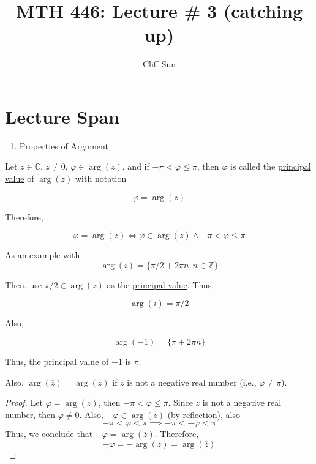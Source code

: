 \documentclass{article}
\title{MTH 446: Lecture \# 3 (catching up)}
\author{Cliff Sun}
\newtheorem{one minute paper}[theorem]{One Minute Paper}
\begin{document}
\maketitle

\section*{Lecture Span}
\begin{enumerate}
    \item Properties of Argument
\end{enumerate}

Let $z \in \mathbb{C}$, $z \neq 0$, $\varphi \in \arg(z)$, and if $-\pi < \varphi \leq \pi$, then 
$\varphi$ is called the \underline{principal value} of $\arg(z)$ with notation 

\begin{equation}
    \varphi = \arg(z)
\end{equation}

Therefore, 

\begin{equation}
    \varphi = \arg(z) \iff \varphi \in \arg(z) \land -\pi  < \varphi \leq \pi
\end{equation}

As an example with
\begin{equation}
    \arg(i) = \{\pi/2 + 2\pi n, n \in \mathbb{Z}\}
\end{equation}

Then, use $\pi/2 \in \arg(z)$ as the \underline{principal value}. Thus, 

\begin{equation}
    \arg(i) = \pi/2
\end{equation}

Also, 

\begin{equation}
    \arg(-1) = \{\pi + 2\pi n\}
\end{equation}

Thus, the principal value of $-1$ is $\pi$. 

Also, $\arg(\overline{z}) = \arg(z)$ if $z$ is not a negative real number (i.e., $\varphi \neq \pi$). 

\begin{proof}
    Let $\varphi = \arg(z)$, then $-\pi < \varphi \leq \pi$. Since $z$ is not a negative real number, then $\varphi \neq 0$. Also, $-\varphi \in \arg(\overline{z})$ (by reflection), also 
    \begin{equation}
        -\pi < \varphi < \pi \implies -\pi < -\varphi < \pi
    \end{equation}
    Thus, we conclude that $-\varphi = \arg(\overline{z})$. 
    Therefore, 
    \begin{equation}
        -\varphi = -\arg(z) = \arg(\overline{z})
    \end{equation}
\end{proof}
\end{document}
